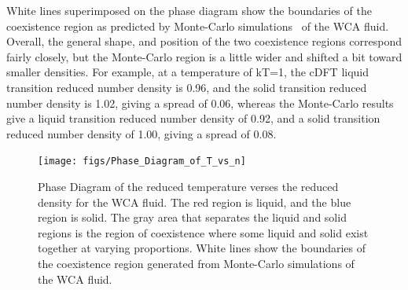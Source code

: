 \documentclass[double,12pt]{beavtex}
\begin{document}
White lines superimposed on the phase diagram show the boundaries of the 
coexistence region as predicted by Monte-Carlo simulations~\cite{May} 
of the WCA fluid. 
Overall, the general shape, and position of the two coexistence regions 
correspond fairly closely, but the Monte-Carlo region is a little wider
and shifted a bit toward smaller densities. For example, at a temperature 
of kT=1, the cDFT liquid transition reduced number density is 0.96, 
and the solid transition reduced number density is 1.02, giving a spread 
of 0.06, whereas the Monte-Carlo results give a liquid transition 
reduced number density of 0.92, and a solid transition reduced number 
density of 1.00, giving a spread of 0.08. 

\begin{figure}
  \centering
  \texttt{[image: figs/Phase\_Diagram\_of\_T\_vs\_n]}
  \caption{Phase Diagram of the reduced temperature verses the reduced 
  density for the WCA fluid. The red region is liquid, and the blue region is 
  solid. The gray area that separates the liquid and solid regions 
  is the region of coexistence where some liquid and solid exist together 
  at varying proportions. White lines show the boundaries of the coexistence 
  region generated from Monte-Carlo simulations of the WCA fluid.}
  \label{fig:Phase_Diagram_of_T_vs_n}
\end{figure}

%
%
%
\end{document}
